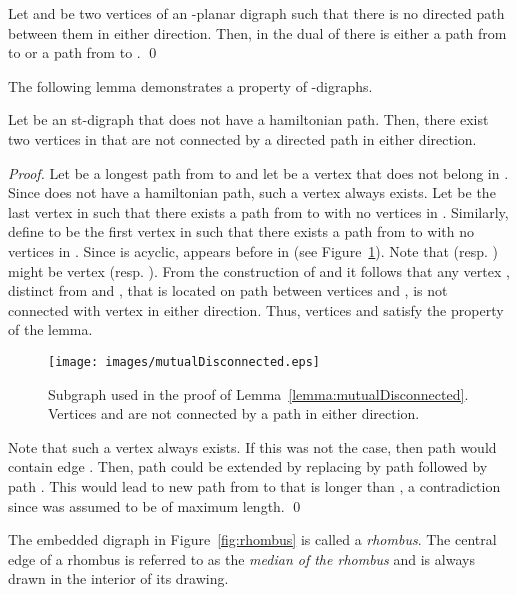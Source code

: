 \documentclass{myllncs-mixalis}
\begin{document}
\begin{lemma}
\label{lem:TamassiaPreparata} Let  and  be two vertices of an
-planar digraph such that there is no directed path between them
in either direction. Then, in the dual  of  there is either
a path from  to  or a path from  to
. \qed
\end{lemma}

The following lemma demonstrates a property of -digraphs.

\begin{lemma}
\label{lemma:mutualDisconnected} Let  be an st-digraph that does
not have a hamiltonian path. Then, there exist two vertices in 
that are not connected by a directed path in either direction.
\end{lemma}

\begin{proof}

Let  be a  longest path from  to  and let  be a vertex
that does not belong in . Since  does not have a hamiltonian
path, such a vertex always exists.  Let  be the last
vertex in  such that there exists a path
  from  to  with no
vertices in . Similarly, define  to be the first vertex
in  such that there exists a path  from  to  with no vertices in . Since 
is acyclic,  appears before  in  (see
Figure~\ref{fig:mutualDisconnected}). Note that  (resp.
) might be vertex  (resp. ). From the construction
of  and  it follows that any vertex ,
distinct from  and , that is located on path 
between vertices   and , is not connected with
vertex  in either direction. Thus, vertices  and  satisfy
the property of the lemma.




\begin{figure}[htb]
    \centering
    \texttt{[image: images/mutualDisconnected.eps]}
    \caption{Subgraph used in the proof of
    Lemma~\ref{lemma:mutualDisconnected}. Vertices  and  are
    not connected by a path in either direction.}
    \label{fig:mutualDisconnected}
\end{figure}

Note that such a vertex  always exists. If this was not the case,
then  path  would contain edge .  Then, path
 could be extended by replacing   by path
 followed by path
. This would lead to new path
 from  to  that is longer than , a contradiction
since  was assumed to be of maximum length. \qed
\end{proof}

 The embedded
digraph in Figure~\ref{fig:rhombus} is called a \emph{rhombus}. The
central edge  of a rhombus is referred to as the \emph{median
of the rhombus} and is always drawn in the interior of its drawing.
\end{document}
